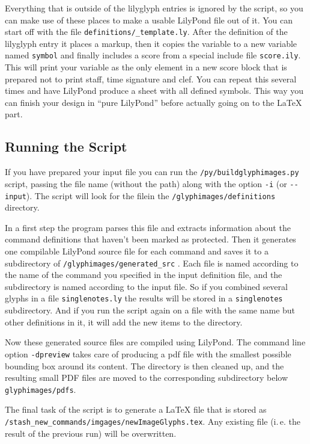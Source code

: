 \documentclass{OLLbook}
\begin{document}
Everything that is outside of the lilyglyph entries is ignored by the script, so you can make use of these places to make a usable LilyPond file out of it.
You can start off with the file \texttt{definitions/\_template.ly}.
After the definition of the lilyglyph entry it places a markup, then it copies the variable to a new variable named \texttt{symbol} and finally includes a score from a special include file \texttt{score.ily}.
This will print your variable as the only element in a new score block that is prepared not to print staff, time signature and clef.
You can repeat this several times and have LilyPond produce a sheet with all defined symbols.
This way you can finish your design in “pure LilyPond” before actually going on to the \LaTeX{} part.


\subsection{Running the Script}
\label{subsec:BGI_running}

If you have prepared your input file you can run the \texttt{/py/buildglyphimages.py} script, passing the file name (without the path) along with the option \verb|-i| (or \verb|--input|). The script will look for the filein the \texttt{/glyphimages/definitions} directory.

In a first step the program parses this file and extracts information about the command definitions that haven't been marked as protected. Then it generates one compilable LilyPond source file for each command and saves it to a subdirectory of \texttt{/glyphimages/generated\_src} .
Each file is named according to the name of the command you specified in the input definition file, and the subdirectory is named according to the input file.
So if you combined several glyphs in a file \texttt{singlenotes.ly} the results will be stored in a \texttt{singlenotes} subdirectory.
And if you run the script again on a file with the same name but other definitions in it, it will add the new items to the directory.

Now these generated source files are compiled using LilyPond. 
The command line option \verb|-dpreview| takes care of producing a pdf file with the smallest possible bounding box around its content.
The directory is then cleaned up, and the resulting small PDF files are moved to the corresponding subdirectory below \texttt{glyphimages/pdfs}.

The final task of the script is to generate a \LaTeX{} file that is stored as \texttt{/stash\_new\_commands/imgages/newImageGlyphs.tex}.
Any existing file (i.\,e. the result of the previous run) will be overwritten.
\end{document}

